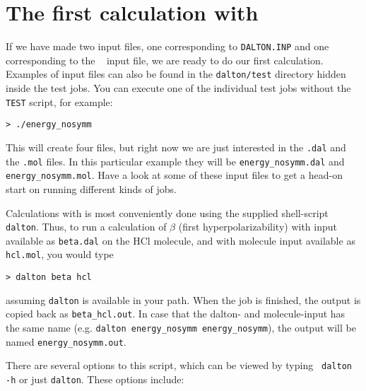 \section{The first calculation with {\dalton}}\label{sec:firstcalc}

If we have made two input files, one corresponding to
\verb|DALTON.INP| and one corresponding to the \mol\
 input file, we
are ready to do our first calculation. Examples of input files can
also be found in the \verb|dalton/test| directory hidden inside the
test jobs. You can execute one of the individual test jobs
without the \verb|TEST| script, for example:
\begin{verbatim}
> ./energy_nosymm
\end{verbatim}
This will create four files, but right now we are just interested in
the \verb|.dal| and the \verb|.mol| files. In this particular example
they will be \verb|energy_nosymm.dal| and
\verb|energy_nosymm.mol|. Have a look at some of these input files to
get a head-on start on running different kinds of {\dalton} jobs.

Calculations with {\dalton} is most conveniently done using the
supplied shell-script \verb|dalton|. Thus,
to run a calculation of $\beta$ (first
hyperpolarizability) 
with input available as \verb|beta.dal| on the HCl molecule, and with
molecule input available as \verb|hcl.mol|, you would type

\begin{verbatim}
> dalton beta hcl
\end{verbatim}
assuming \verb|dalton| is available in your path. When the job is
finished, the output is copied back as \verb|beta_hcl.out|. In case that the
dalton- and molecule-input has the same name (e.g.
\verb|dalton energy_nosymm energy_nosymm|), the output will be named
\verb|energy_nosymm.out|.

There are several options to this script, which can be viewed by
typing \verb| dalton -h| or just \verb|dalton|. These options include:

